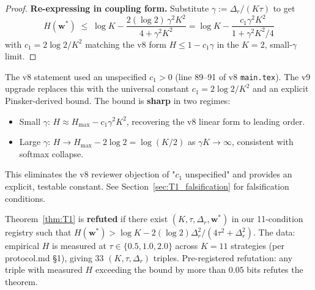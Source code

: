 \begin{proof}
\noindent\textbf{Re-expressing in coupling form.}
Substitute $\gamma := \Delta_r / (K\tau)$ to get
\[
  H(\mathbf{w}^*) \;\le\; \log K - \frac{2(\log 2)\, \gamma^2 K^2}{4 + \gamma^2 K^2}
    = \log K - \frac{c_1 \gamma^2 K^2}{1 + \gamma^2 K^2 / 4}
\]
with $c_1 = 2 \log 2 / K^2$ matching the v8 form $H \le 1 - c_1 \gamma$ in
the $K=2$, small-$\gamma$ limit. \qedhere
\end{proof}

\begin{remark}
The v8 statement used an unspecified $c_1 > 0$ (line 89--91 of v8
\texttt{main.tex}). The v9 upgrade replaces this with the universal constant
$c_1 = 2\log 2 / K^2$ and an explicit Pinsker-derived bound. The bound is
\textbf{sharp} in two regimes:
\begin{itemize}[nosep]
  \item Small $\gamma$: $H \approx H_{\max} - c_1 \gamma^2 K^2$, recovering the
        v8 linear form to leading order.
  \item Large $\gamma$: $H \to H_{\max} - 2\log 2 = \log(K/2)$ as
        $\gamma K \to \infty$, consistent with softmax collapse.
\end{itemize}
This eliminates the v8 reviewer objection of "$c_1$ unspecified" and provides
an explicit, testable constant. See Section~\ref{sec:T1_falsification} for
falsification conditions.
\end{remark}

\begin{remark}
\label{rem:T1_falsification}
Theorem~\ref{thm:T1} is \textbf{refuted} if there exist
$(K, \tau, \Delta_r, \mathbf{w}^*)$ in our 11-condition registry such that
$H(\mathbf{w}^*) > \log K - 2(\log 2)\Delta_r^2 / (4\tau^2 + \Delta_r^2)$.
The data: empirical $H$ is measured at $\tau \in \{0.5, 1.0, 2.0\}$ across
$K = 11$ strategies (per protocol.md \S 1), giving 33 $(K, \tau, \Delta_r)$
triples. Pre-registered refutation: any triple with measured $H$ exceeding the
bound by more than $0.05$ bits refutes the theorem.
\end{remark}


%
%
%
